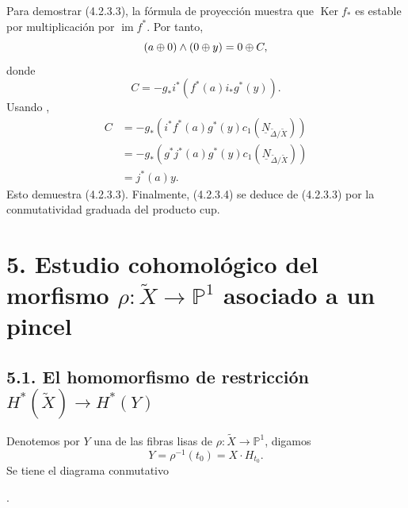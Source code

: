 Para demostrar (4.2.3.3), la fórmula de proyección muestra que
$\operatorname{Ker}f_*$ es estable por multiplicación por
$\operatorname{im}f^*$. Por tanto,
\[
(a\oplus0)\wedge(0\oplus y)=0\oplus C,
\]
donde
\begin{equation}\tag{4.3.3}
C=-g_*i^*\!\left(f^*(a)i_*g^*(y)\right).
\end{equation}
Usando ,
\[
\begin{aligned}
C
&=-g_*\!\left(i^*f^*(a)g^*(y)
      c_1(\underline N_{\widetilde\Delta/\widetilde X})\right)\\
&=-g_*\!\left(g^*j^*(a)g^*(y)
      c_1(\underline N_{\widetilde\Delta/\widetilde X})\right)\\
&=j^*(a)y.
\end{aligned}
\]
Esto demuestra (4.2.3.3). Finalmente, (4.2.3.4) se deduce de
(4.2.3.3) por la conmutatividad graduada del producto cup.

\pageoriginale

\section*[5. Morfismo asociado a un pincel]{\texorpdfstring{5. Estudio cohomológico del morfismo
$\rho:\widetilde X\longrightarrow\mathbb P^1$ asociado a un pincel}{5. Estudio cohomológico del morfismo rho de X tilde a P1 asociado a un pincel}}

\subsection*{\texorpdfstring{5.1. El homomorfismo de restricción
$H^*(\widetilde X)\longrightarrow H^*(Y)$}{5.1. El homomorfismo de restricción en cohomología}}

Denotemos por $Y$ una de las fibras lisas de
$\rho:\widetilde X\to\mathbb P^1$, digamos
\[
Y=\rho^{-1}(t_0)=X\mathbin{\cdot}H_{t_0}.
\]
Se tiene el diagrama conmutativo
\begin{center}
.
\end{center}

